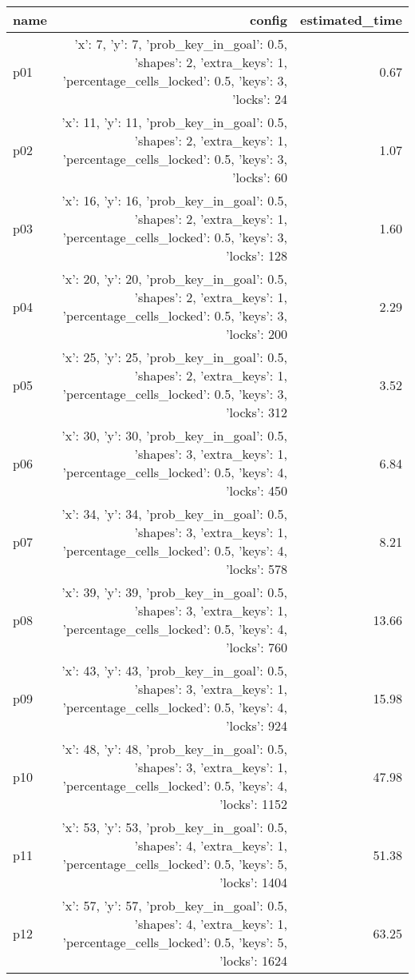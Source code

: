 \documentclass{article}
\begin{document}
                            \begin{center}
                            \scriptsize
                            \begin{tabular}{@{}l|r|r@{}}
                            name & config & estimated\_time\\\midrule
                              p01&{'x': 7, 'y': 7, 'prob\_key\_in\_goal': 0.5, 'shapes': 2, 'extra\_keys': 1, 'percentage\_cells\_locked': 0.5, 'keys': 3, 'locks': 24}&0.67\\
  p02&{'x': 11, 'y': 11, 'prob\_key\_in\_goal': 0.5, 'shapes': 2, 'extra\_keys': 1, 'percentage\_cells\_locked': 0.5, 'keys': 3, 'locks': 60}&1.07\\
  p03&{'x': 16, 'y': 16, 'prob\_key\_in\_goal': 0.5, 'shapes': 2, 'extra\_keys': 1, 'percentage\_cells\_locked': 0.5, 'keys': 3, 'locks': 128}&1.60\\
  p04&{'x': 20, 'y': 20, 'prob\_key\_in\_goal': 0.5, 'shapes': 2, 'extra\_keys': 1, 'percentage\_cells\_locked': 0.5, 'keys': 3, 'locks': 200}&2.29\\
  p05&{'x': 25, 'y': 25, 'prob\_key\_in\_goal': 0.5, 'shapes': 2, 'extra\_keys': 1, 'percentage\_cells\_locked': 0.5, 'keys': 3, 'locks': 312}&3.52\\
  p06&{'x': 30, 'y': 30, 'prob\_key\_in\_goal': 0.5, 'shapes': 3, 'extra\_keys': 1, 'percentage\_cells\_locked': 0.5, 'keys': 4, 'locks': 450}&6.84\\
  p07&{'x': 34, 'y': 34, 'prob\_key\_in\_goal': 0.5, 'shapes': 3, 'extra\_keys': 1, 'percentage\_cells\_locked': 0.5, 'keys': 4, 'locks': 578}&8.21\\
  p08&{'x': 39, 'y': 39, 'prob\_key\_in\_goal': 0.5, 'shapes': 3, 'extra\_keys': 1, 'percentage\_cells\_locked': 0.5, 'keys': 4, 'locks': 760}&13.66\\
  p09&{'x': 43, 'y': 43, 'prob\_key\_in\_goal': 0.5, 'shapes': 3, 'extra\_keys': 1, 'percentage\_cells\_locked': 0.5, 'keys': 4, 'locks': 924}&15.98\\
  p10&{'x': 48, 'y': 48, 'prob\_key\_in\_goal': 0.5, 'shapes': 3, 'extra\_keys': 1, 'percentage\_cells\_locked': 0.5, 'keys': 4, 'locks': 1152}&47.98\\
  p11&{'x': 53, 'y': 53, 'prob\_key\_in\_goal': 0.5, 'shapes': 4, 'extra\_keys': 1, 'percentage\_cells\_locked': 0.5, 'keys': 5, 'locks': 1404}&51.38\\
  p12&{'x': 57, 'y': 57, 'prob\_key\_in\_goal': 0.5, 'shapes': 4, 'extra\_keys': 1, 'percentage\_cells\_locked': 0.5, 'keys': 5, 'locks': 1624}&63.25\\

\end{tabular}
\end{center}
\end{document}
